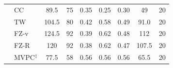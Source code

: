 \begin{tabular}{llccccccc}
                     & CC                 & 89.5 & 75 & 0.35 & 0.25 & 0.30 & 49 & 20 \\
                     & TW                 & 104.5 & 80 & 0.42 & 0.58 & 0.49 & 91.0 & 20 \\
                     & FZ-v               & 124.5 & 92 & 0.39 & 0.62 & 0.48 & 112 & 20 \\
                     & FZ-R               & 120 & 92 & 0.38 & 0.62 & 0.47 & 107.5 & 20 \\
                     & MVPC$^\ddagger$    & 77.5 & 58 & 0.56 & 0.56 & 0.56 & 65.5 & 20 \\
    \bottomrule
\end{tabular}

